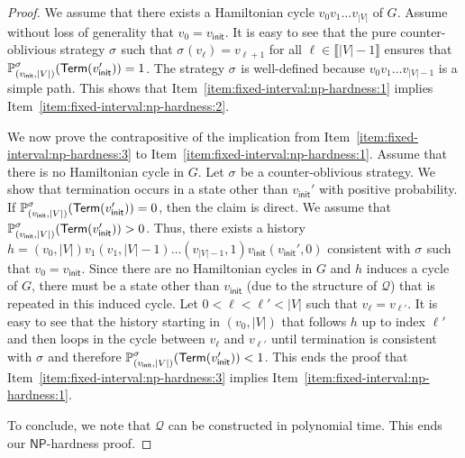 \documentclass[a4paper,UKenglish,cleveref,autoref,thm-restate,colorlinks]{lipics-v2021}
\newcommand{\init}{\mathsf{init}}
\newcommand{\integerInterval}[1]{\llbracket{}#1\rrbracket{}}
\newcommand{\np}{\textsf{NP}}
\newcommand{\graph}{G}
\newcommand{\vertexSet}{V}
\newcommand{\vertex}{v}
\newcommand{\hist}{h}
\newcommand{\indexPosition}{\ell}
\newcommand{\ocmdp}{\mathcal{Q}}
\newcommand{\termination}{\mathsf{Term}}
\newcommand{\selectiveTermination}[1]{\termination({#1})}
\newcommand{\stratGeneric}[1]{{\sigma_{#1}}}
\newcommand{\strat}{\stratGeneric{}}
\begin{document}
\begin{proof}
  We assume that there exists a Hamiltonian cycle $\vertex_0\vertex_1\ldots\vertex_{|V|}$ of $\graph$.
  Assume without loss of generality that $\vertex_0 = \vertex_\init$.
  It is easy to see that the pure counter-oblivious strategy $\strat$ such that $\strat(\vertex_\indexPosition) = \vertex_{\indexPosition+1}$ for all $\indexPosition\in\integerInterval{|\vertexSet|-1}$ ensures that $\probaG{(\vertex_\init, |\vertexSet|)}{\strat}(\selectiveTermination{\vertex_\init'})=1$.
  The strategy $\strat$ is well-defined because $\vertex_0\vertex_1\ldots\vertex_{|V|-1}$ is a simple path.
  This shows that Item~\ref{item:fixed-interval:np-hardness:1} implies Item~\ref{item:fixed-interval:np-hardness:2}.

  We now prove the contrapositive of the implication from Item~\ref{item:fixed-interval:np-hardness:3} to Item~\ref{item:fixed-interval:np-hardness:1}.
  Assume that there is no Hamiltonian cycle in $\graph$.
  Let $\strat$ be a counter-oblivious strategy.
  We show that termination occurs in a state other than $\vertex_\init'$ with positive probability.
  If $\probaG{(\vertex_\init, |\vertexSet|)}{\strat}(\selectiveTermination{\vertex_\init'})=0$, then the claim is direct.
  We assume that $\probaG{(\vertex_\init, |\vertexSet|)}{\strat}(\selectiveTermination{\vertex_\init'})>0$.
  Thus, there exists a history $\hist = (\vertex_0, |\vertexSet|)\vertex_1(\vertex_1, |\vertexSet|-1)\ldots (\vertex_{|\vertexSet|-1}, 1)\vertex_\init(\vertex_\init', 0)$ consistent with $\strat$ such that $\vertex_0 = \vertex_\init$.
  Since there are no Hamiltonian cycles in $\graph$ and $\hist$ induces a cycle of $\graph$, there must be a state other than $\vertex_\init$ (due to the structure of $\ocmdp$) that is repeated in this induced cycle.
  Let $0 < \indexPosition < \indexPosition' < |\vertexSet|$ such that $\vertex_\indexPosition = \vertex_{\indexPosition'}$.
  It is easy to see that the history starting in $(\vertex_0, |\vertexSet|)$ that follows $\hist$ up to index $\indexPosition'$ and then loops in the cycle between $\vertex_\indexPosition$ and $\vertex_{\indexPosition'}$ until termination is consistent with $\strat$ and therefore $\probaG{(\vertex_\init, |\vertexSet|)}{\strat}(\selectiveTermination{\vertex_\init'})<1$.
  This ends the proof that Item~\ref{item:fixed-interval:np-hardness:3} implies Item~\ref{item:fixed-interval:np-hardness:1}.

  To conclude, we note that $\ocmdp$ can be constructed in polynomial time.
  This ends our $\np$-hardness proof.
\end{proof}
\end{document}
